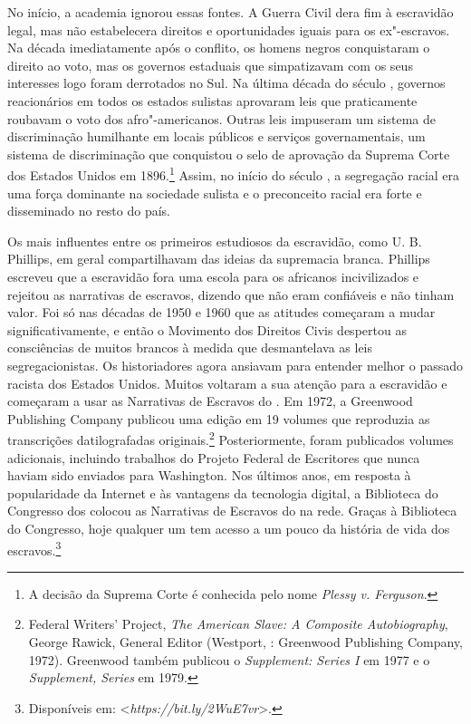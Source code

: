 No início, a academia ignorou essas fontes. A Guerra Civil dera fim à
escravidão legal, mas não estabelecera direitos e oportunidades iguais
para os ex"-escravos. Na década imediatamente após o conflito, os homens
negros conquistaram o direito ao voto, mas os governos estaduais que
simpatizavam com os seus interesses logo foram derrotados no Sul. Na
última década do século , governos reacionários em todos os estados
sulistas aprovaram leis que praticamente roubavam o voto dos
afro"-americanos. Outras leis impuseram um sistema de discriminação
humilhante em locais públicos e serviços governamentais, um sistema de
discriminação que conquistou o selo de aprovação da Suprema Corte dos
Estados Unidos em 1896.\footnote{A decisão da Suprema Corte é conhecida
  pelo nome \emph{Plessy v. Ferguson}.} Assim, no início do século , a
segregação racial era uma força dominante na sociedade sulista e o
preconceito racial era forte e disseminado no resto do país.

Os mais influentes entre os primeiros estudiosos da escravidão, como U.
B. Phillips, em geral compartilhavam das ideias da supremacia branca.
Phillips escreveu que a escravidão fora uma escola para os africanos
incivilizados e rejeitou as narrativas de escravos, dizendo que não eram
confiáveis e não tinham valor. Foi só nas décadas de 1950 e 1960 que as
atitudes começaram a mudar significativamente, e então o Movimento dos
Direitos Civis despertou as consciências de muitos brancos à medida que
desmantelava as leis segregacionistas. Os historiadores agora ansiavam
para entender melhor o passado racista dos Estados Unidos. Muitos
voltaram a sua atenção para a escravidão e começaram a usar as
Narrativas de Escravos do . Em 1972, a Greenwood Publishing Company
publicou uma edição em 19 volumes que reproduzia as transcrições
datilografadas originais.\footnote{Federal Writers' Project, \emph{The
  American Slave: A Composite Autobiography}, George Rawick, General
  Editor (Westport, : Greenwood Publishing Company, 1972). Greenwood
  também publicou o \emph{Supplement: Series I} em 1977 e o
  \emph{Supplement, Series } em 1979.} Posteriormente, foram
publicados volumes adicionais, incluindo trabalhos do Projeto Federal de
Escritores que nunca haviam sido enviados para Washington. Nos últimos
anos, em resposta à popularidade da Internet e às vantagens da
tecnologia digital, a Biblioteca do Congresso dos  colocou as
Narrativas de Escravos do  na rede. Graças à Biblioteca do Congresso,
hoje qualquer um tem acesso a um pouco da história de vida dos
escravos.\footnote{Disponíveis em:
  \textless{}\emph{https://bit.ly/2WuE7vr}\textgreater{}.}

